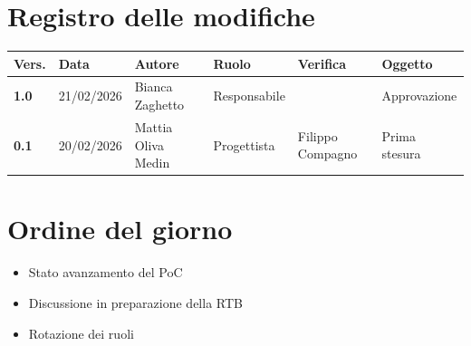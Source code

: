 \documentclass[a4paper,12pt]{article}
\begin{document}
    

    \newpage
    \section*{Registro delle modifiche}

    \begin{table}[h!]
        \begin{tabularx}{\textwidth}{|l|l|l|l|X|X|}
            \hline
            \textbf{Vers.} & \textbf{Data} & \textbf{Autore} & \textbf{Ruolo} & \textbf{Verifica} & \textbf{Oggetto} \\
            \hline
            \textbf{1.0} & 21/02/2026 & Bianca Zaghetto & Responsabile &  & Approvazione \\
            \hline
            \textbf{0.1} & 20/02/2026 & Mattia Oliva Medin & Progettista & Filippo Compagno & Prima stesura \\
            \hline
        \end{tabularx}
    \end{table}

    \newpage
    \tableofcontents
    \newpage

    \section{Ordine del giorno} {
        \begin{itemize}
            \item Stato avanzamento del PoC
            \item Discussione in preparazione della RTB
            \item Rotazione dei ruoli
        \end{itemize}
    }
\end{document}
